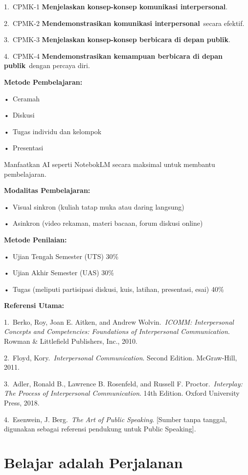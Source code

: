 \documentclass[
  letterpaper,
  DIV=11,
  numbers=noendperiod]{scrreprt}
\begin{document}
1.~CPMK-1 \textbf{Menjelaskan konsep-konsep komunikasi interpersonal}.

2.~CPMK-2 \textbf{Mendemonstrasikan komunikasi interpersonal}~secara
efektif.

3.~CPMK-3 \textbf{Menjelaskan konsep-konsep berbicara di depan publik}.

4.~CPMK-4 \textbf{Mendemonstrasikan kemampuan berbicara di depan
publik}~dengan percaya diri.

\textbf{Metode Pembelajaran:}

•~Ceramah

•~Diskusi

•~Tugas individu dan kelompok

•~Presentasi

Manfaatkan AI seperti NotebokLM secara maksimal untuk membantu
pembelajaran.

\textbf{Modalitas Pembelajaran:}

•~Visual sinkron (kuliah tatap muka atau daring langsung)

•~Asinkron (video rekaman, materi bacaan, forum diskusi online)

\textbf{Metode Penilaian:}

•~Ujian Tengah Semester (UTS) 30\%

•~Ujian Akhir Semester (UAS) 30\%

•~Tugas (meliputi partisipasi diskusi, kuis, latihan, presentasi, esai)
40\%

\textbf{Referensi Utama:}

1.~Berko, Roy, Joan E. Aitken, and Andrew Wolvin.~\emph{ICOMM:
Interpersonal Concepts and Competencies: Foundations of Interpersonal
Communication}. Rowman \& Littlefield Publishers, Inc., 2010.

2.~Floyd, Kory.~\emph{Interpersonal Communication}. Second Edition.
McGraw-Hill, 2011.

3.~Adler, Ronald B., Lawrence B. Rosenfeld, and Russell F.
Proctor.~\emph{Interplay: The Process of Interpersonal Communication}.
14th Edition. Oxford University Press, 2018.

4.~Esenwein, J. Berg.~\emph{The Art of Public Speaking}. {[}Sumber tanpa
tanggal, digunakan sebagai referensi pendukung untuk Public Speaking{]}.

\section*{Belajar adalah Perjalanan}\label{belajar-adalah-perjalanan}
\end{document}
